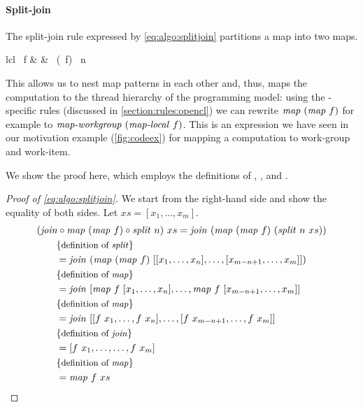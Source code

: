 \paragraph{Split-join}
The split-join rule expressed by \autoref{eq:algo:splitjoin} partitions a map into two maps.
%
\begin{rerule}{lcl}
  \map\ f
    & \rightarrow &
      \join \circ \map\ (\map\ f) \circ \splitN\ n
  \label{eq:algo:splitjoin}
\end{rerule}
%
This allows us to nest map patterns in each other and, thus, maps the computation to the thread hierarchy of the \OpenCL programming model:
using the \OpenCL-specific rules (discussed in \autoref{section:rules:opencl}) we can rewrite $\text{\textit{map}}\ (\text{\textit{map}}\ f)$ for example to $\text{\textit{map-workgroup}}\ (\text{\textit{map-local}}\ f)$.
This is an expression we have seen in our motivation example (\autoref{fig:codeex}) for mapping a computation to \OpenCL work-group and work-item.

We show the proof here, which employs the definitions of \splitN, \map, and \join.

\begin{proof}[Proof of \autoref{eq:algo:splitjoin}]
  We start from the right-hand side and show the equality of both sides.
  Let $xs = [x_1, \ldots, x_m]$.
  \begin{align*}
    &(\join \circ \map\ (\map\ f) \circ \splitN\ n)\ xs = \join\ (\map\ (\map\ f)\ (\splitN\ n\ xs))\\
    &\qquad \comment{definition of \splitN}\\
    &\qquad = \join\ (\map\ (\map\ f)\ [[x_1, \ldots, x_n], \ldots, [x_{m-n+1}, \ldots, x_m]])\\
    &\qquad \comment{definition of \map}\\
    &\qquad = \join\ [\map\ f\ [x_1, \ldots, x_n], \ldots, \map\ f\ [x_{m-n+1}, \ldots, x_m]]\\
    &\qquad \comment{definition of \map}\\
    &\qquad = \join\ [[f\ x_1, \ldots, f\ x_n], \ldots, [f\ x_{m-n+1}, \ldots, f\ x_m]]\\
    &\qquad \comment{definition of \join}\\
    &\qquad = [f\ x_1, \ldots, \ldots, f\ x_m]\\
    &\qquad \comment{definition of \map}\\
    &\qquad = \map\ f\ xs
  \end{align*}
\end{proof}

